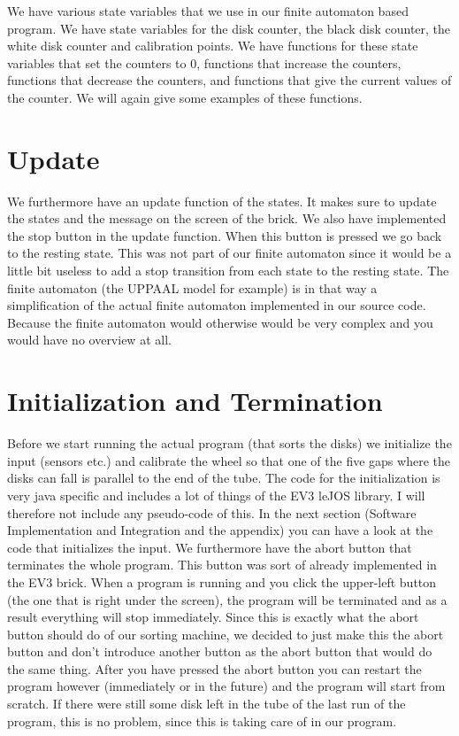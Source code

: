 

\newpage We have various state variables that we use in our finite automaton based program. We have state variables for the disk counter, the black disk counter, the white disk counter and calibration points. We have functions for these state variables that set the counters to 0, functions that increase the counters, functions that decrease the counters, and functions that give the current values of the counter. We will again give some examples of these functions. 



\section{Update}
We furthermore have an update function of the states. It makes sure to update the states and the message on the screen of the brick. We also have implemented the stop button in the update function. When this button is pressed we go back to the resting state. This was not part of our finite automaton since it would be a little bit useless to add a stop transition from each state to the resting state. The finite automaton (the UPPAAL model for example) is in that way a simplification of the actual finite automaton implemented in our source code. Because the finite automaton would otherwise would be very complex and you would have no overview at all.


\newpage
\section{Initialization and Termination}
Before we start running the actual program (that sorts the disks) we initialize the input (sensors etc.) and calibrate the wheel so that one of the five gaps where the disks can fall is parallel to the end of the tube. The code for the initialization is very java specific and includes a lot of things of the EV3 leJOS library. I will therefore not include any pseudo-code of this. In the next section (Software Implementation and Integration and the appendix) you can have a look at the code that initializes the input. We furthermore have the abort button that terminates the whole program. This button was sort of already implemented in the EV3 brick. When a program is running and you click the upper-left button (the one that is right under the screen), the program will be terminated and as a result everything will stop immediately. Since this is exactly what the abort button should do of our sorting machine, we decided to just make this the abort button and don't introduce another button as the abort button that would do the same thing. After you have pressed the abort button you can restart the program however (immediately or in the future) and the program will start from scratch. If there were still some disk left in the tube of the last run of the program, this is no problem, since this is taking care of in our program. \\




 
 









